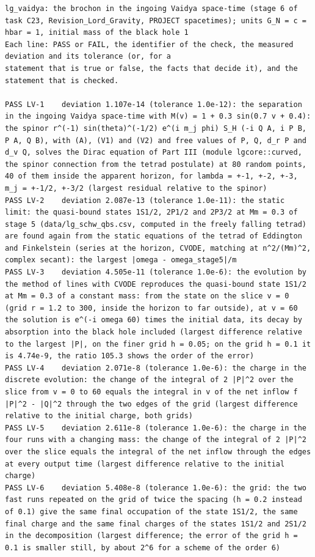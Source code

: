 \documentclass[
  10pt,
]{article}
\begin{document}
\begin{verbatim}
lg_vaidya: the brochon in the ingoing Vaidya space-time (stage 6 of task C23, Revision_Lord_Gravity, PROJECT spacetimes); units G_N = c = hbar = 1, initial mass of the black hole 1
Each line: PASS or FAIL, the identifier of the check, the measured deviation and its tolerance (or, for a
statement that is true or false, the facts that decide it), and the statement that is checked.

PASS LV-1    deviation 1.107e-14 (tolerance 1.0e-12): the separation in the ingoing Vaidya space-time with M(v) = 1 + 0.3 sin(0.7 v + 0.4): the spinor r^(-1) sin(theta)^(-1/2) e^(i m_j phi) S_H (-i Q A, i P B, P A, Q B), with (A), (V1) and (V2) and free values of P, Q, d_r P and d_v Q, solves the Dirac equation of Part III (module lgcore::curved, the spinor connection from the tetrad postulate) at 80 random points, 40 of them inside the apparent horizon, for lambda = +-1, +-2, +-3, m_j = +-1/2, +-3/2 (largest residual relative to the spinor)
PASS LV-2    deviation 2.087e-13 (tolerance 1.0e-11): the static limit: the quasi-bound states 1S1/2, 2P1/2 and 2P3/2 at Mm = 0.3 of stage 5 (data/lg_schw_qbs.csv, computed in the freely falling tetrad) are found again from the static equations of the tetrad of Eddington and Finkelstein (series at the horizon, CVODE, matching at n^2/(Mm)^2, complex secant): the largest |omega - omega_stage5|/m
PASS LV-3    deviation 4.505e-11 (tolerance 1.0e-6): the evolution by the method of lines with CVODE reproduces the quasi-bound state 1S1/2 at Mm = 0.3 of a constant mass: from the state on the slice v = 0 (grid r = 1.2 to 300, inside the horizon to far outside), at v = 60 the solution is e^(-i omega 60) times the initial data, its decay by absorption into the black hole included (largest difference relative to the largest |P|, on the finer grid h = 0.05; on the grid h = 0.1 it is 4.74e-9, the ratio 105.3 shows the order of the error)
PASS LV-4    deviation 2.071e-8 (tolerance 1.0e-6): the charge in the discrete evolution: the change of the integral of 2 |P|^2 over the slice from v = 0 to 60 equals the integral in v of the net inflow f |P|^2 - |Q|^2 through the two edges of the grid (largest difference relative to the initial charge, both grids)
PASS LV-5    deviation 2.611e-8 (tolerance 1.0e-6): the charge in the four runs with a changing mass: the change of the integral of 2 |P|^2 over the slice equals the integral of the net inflow through the edges at every output time (largest difference relative to the initial charge)
PASS LV-6    deviation 5.408e-8 (tolerance 1.0e-6): the grid: the two fast runs repeated on the grid of twice the spacing (h = 0.2 instead of 0.1) give the same final occupation of the state 1S1/2, the same final charge and the same final charges of the states 1S1/2 and 2S1/2 in the decomposition (largest difference; the error of the grid h = 0.1 is smaller still, by about 2^6 for a scheme of the order 6)

\end{verbatim}
\end{document}
